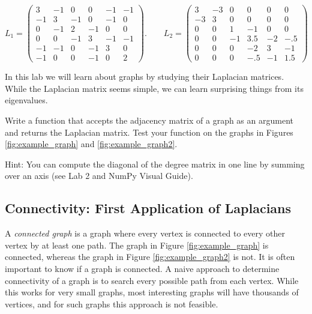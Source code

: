\[
L_1 = \begin{pmatrix}
3 & -1 & 0 & 0 & -1 & -1\\
-1 & 3 & -1 & 0 & -1 & 0\\
0 & -1 & 2 & -1 & 0 & 0\\
0 & 0 & -1 & 3 & -1 & -1\\
-1 & -1 & 0 & -1 & 3& 0\\
-1 & 0 & 0 & -1 & 0 & 2
\end{pmatrix}. \qquad L_2 =
 \begin{pmatrix}
3 & -3 & 0 & 0 & 0 & 0\\
-3 & 3 & 0 & 0 & 0 & 0\\
0 & 0 & 1 & -1 & 0 & 0\\
0 & 0 & -1 & 3.5 & -2 & -.5\\
0 & 0 & 0 & -2 & 3 & -1\\
0 & 0 & 0 &- .5 & -1 & 1.5
\end{pmatrix}
\]

In this lab we will learn about graphs by studying their Laplacian matrices.
While the Laplacian matrix seems simple, we can learn surprising things from its eigenvalues.


\begin{problem}
Write a function that accepts the adjacency matrix of a graph as an argument and returns the Laplacian matrix.
Test your function on the graphs in Figures \ref{fig:example_graph} and \ref{fig:example_graph2}.

Hint: You can compute the diagonal of the degree matrix in one line by summing over an axis (see Lab 2 and NumPy Visual Guide).
\label{prob:laplacian}
\end{problem}



\subsection*{Connectivity: First Application of Laplacians}

A \emph{connected graph} is a graph where every vertex is connected to every other vertex by at least one path.
The graph in Figure \ref{fig:example_graph} is connected, whereas the graph in Figure \ref{fig:example_graph2} is not.
It is often important to know if a graph is connected.
A naive approach to determine connectivity of a graph is to search every possible path from each vertex.
While this works for very small graphs, most interesting graphs will have thousands of vertices, and for such graphs this approach is not feasible.

